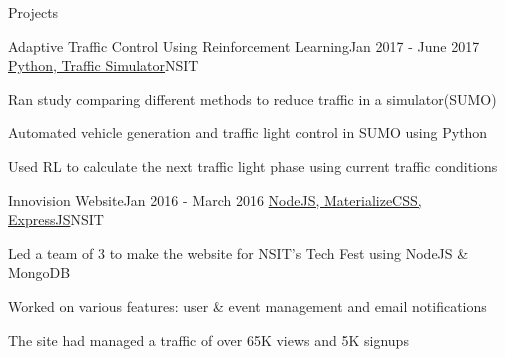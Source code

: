 \documentclass{resume} %
\begin{document}
\begin{rSection}{Projects}

    \begin{rSubsection}{Adaptive Traffic Control Using Reinforcement Learning}{Jan 2017 - June 2017}
    {\href{https://github.com/rohit-smpx/trafficRL}{Python, Traffic Simulator}}{NSIT}

        \item Ran study comparing different methods to reduce traffic in a simulator(SUMO)
        \item Automated vehicle generation and traffic light control in SUMO using Python
        \item Used RL to calculate the next traffic light phase using current traffic conditions
    \end{rSubsection}

    \begin{rSubsection}{Innovision Website}{Jan 2016 - March 2016}
    {\href{https://github.com/rohit-smpx/inno}{NodeJS, MaterializeCSS, ExpressJS}}{NSIT}

        \item Led a team of 3 to make the website for NSIT’s Tech Fest using NodeJS \& MongoDB
        \item Worked on various features: user \& event management and email notifications
        \item The site had managed a traffic of over 65K views and 5K signups
    \end{rSubsection}

\end{rSection}


\end{document}
